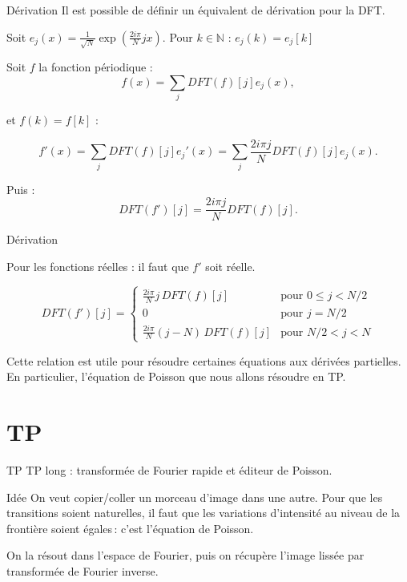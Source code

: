 \begin{frame}{Dérivation}
Il est possible de définir un équivalent de dérivation pour la DFT.

Soit $e_j(x) = \frac{1}{\sqrt{N}}\exp(\frac{2i\pi}{N}jx)$.
Pour $k \in \mathbb{N}$ :  $e_j(k)=e_j[k]$ 

Soit $f$ la fonction périodique :
\[f(x) = \sum_j DFT(f)[j]e_j(x),\]

et $f(k) = f[k]$ : 

\[f'(x) = \sum_j DFT(f)[j]e_j'(x)=\sum_j \frac{2i\pi j}{N}DFT(f)[j]e_j(x).\]

Puis : 
\[DFT(f')[j] = \frac{2i\pi j}{N}DFT(f)[j].\]
\end{frame}

\begin{frame}{Dérivation}

Pour les fonctions réelles : il faut que $f'$ soit réelle.

\[
DFT(f')[j] =
\begin{cases}
\frac{2i\pi}{N}j\,DFT(f)[j] & \text{pour }0\leq j<N/2\\
0 & \text{pour }j=N/2\\
\frac{2i\pi}{N}(j-N)\,DFT(f)[j] & \text{pour }N/2<j<N
\end{cases}
\]

Cette relation est utile pour résoudre certaines équations aux dérivées partielles. En particulier, l'équation de Poisson que nous allons résoudre en TP.

\end{frame}

\section{TP}
\begin{frame}{TP}
	TP long : transformée de Fourier rapide et éditeur de Poisson.
	
	\begin{block}{Idée}
	On veut copier/coller un morceau d'image dans une autre. Pour que les transitions soient naturelles, il faut que les variations d'intensité au niveau de la frontière soient égales\,: c'est l'équation de Poisson.
	
	On la résout dans l'espace de Fourier, puis on récupère l'image lissée par transformée de Fourier inverse.
	\end{block}
\end{frame}

